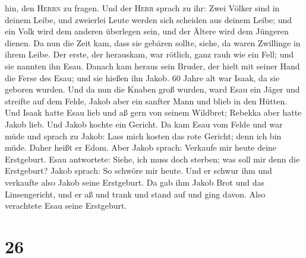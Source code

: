 hin, den \textsc{Herrn} zu fragen.  Und der \textsc{Herr}
sprach zu ihr: Zwei Völker sind in deinem Leibe, und zweierlei Leute
werden sich scheiden aus deinem Leibe; und ein Volk wird dem anderen
überlegen sein, und der Ältere wird dem Jüngeren dienen. 
Da nun die Zeit kam, dass sie gebären sollte, siehe, da waren Zwillinge
in ihrem Leibe.  Der erste, der herauskam, war rötlich,
ganz rauh wie ein Fell; und sie nannten ihn Esau.  Danach
kam heraus sein Bruder, der hielt mit seiner Hand die Ferse des Esau;
und sie hießen ihn Jakob. 60 Jahre alt war Isaak, da sie geboren wurden.
 Und da nun die Knaben groß wurden, ward Esau ein Jäger
und streifte auf dem Felde, Jakob aber ein sanfter Mann und blieb in den
Hütten.  Und Isaak hatte Esau lieb und aß gern von seinem
Wildbret; Rebekka aber hatte Jakob lieb.  Und Jakob
kochte ein Gericht. Da kam Esau vom Felde und war müde 
und sprach zu Jakob: Lass mich kosten das rote Gericht; denn ich bin
müde. Daher heißt er Edom.  Aber Jakob sprach: Verkaufe
mir heute deine Erstgeburt.  Esau antwortete: Siehe, ich
muss doch sterben; was soll mir denn die Erstgeburt? 
Jakob sprach: So schwöre mir heute. Und er schwur ihm und verkaufte also
Jakob seine Erstgeburt.  Da gab ihm Jakob Brot und das
Linsengericht, und er aß und trank und stand auf und ging davon. Also
verachtete Esau seine Erstgeburt.

\hypertarget{section-25}{%
\section{26}\label{section-25}}

